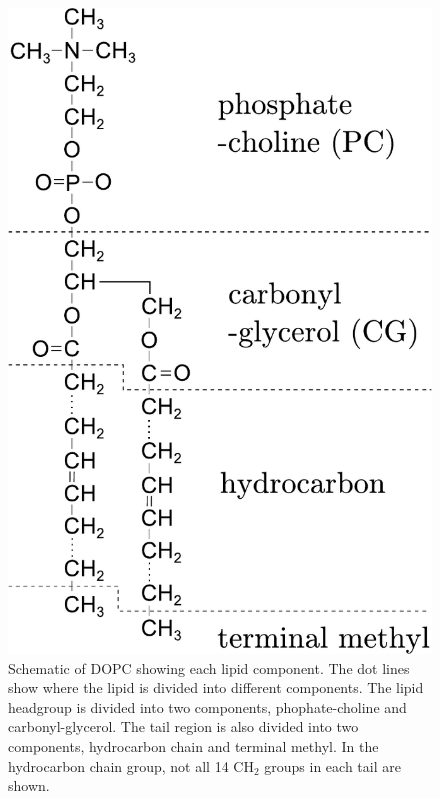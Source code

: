 \documentclass[12pt,letterpaper]{article}
\begin{document}
\begin{figure}
  \centering
  \includegraphics[scale=0.7]{./figures/dopc_schematic.pdf}
  \caption{Schematic of DOPC showing each lipid component. The dot lines 
           show where the lipid is divided into different components. 
           The lipid headgroup
           is divided into two components, phophate-choline and carbonyl-glycerol. 
           The tail region is also divided
           into two components, hydrocarbon chain and terminal methyl.
           In the hydrocarbon chain group, not all 14 $\textrm{CH}_2$ groups
           in each tail are shown.}
  \label{fig:dopc_schematic}
\end{figure}
\end{document}
